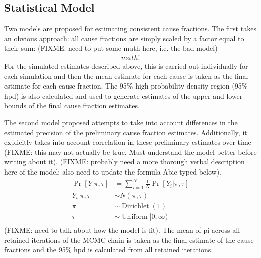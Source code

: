 \documentclass[10pt]{bmc_article}
\newcommand{\Dirichlet}{\operatorname{Dirichlet}}
\newcommand{\Uniform}{\operatorname{Uniform}}
\newenvironment{bmcformat}{\begin{raggedright}\baselineskip20pt\sloppy\setboolean{publ}{false}}{\end{raggedright}\baselineskip20pt\sloppy}
\begin{document}
\begin{bmcformat}
  \subsection*{Statistical Model}
    Two models are proposed for estimating consistent cause fractions. The first takes an obvious
    approach: all cause fractions are simply scaled by a factor equal to their sum: 
    (FIXME: need to put some math here, i.e. the bad model)
  \begin{align*}
    math!
  \end{align*}
    For the simulated estimates described above, this is carried out individually for 
    each simulation and then the mean estimate for each cause is taken as the final 
    estimate for each cause fraction. The 95\% high probability density region (95\% hpd) 
    is also calculated and used to generate estimates of the upper and lower bounds of 
    the final cause fraction estimates. \pb

    The second model proposed attempts to take into account differences in the estimated 
    precision of the preliminary cause fraction estimates. Additionally, it explicitly 
    takes into account correlation in these preliminary estimates over time (FIXME: this 
    may not actually be true. Must understand the model better before writing about it). 
    (FIXME: probably need a more thorough verbal description here of the model; also 
    need to update the formula Abie typed below). 
  \begin{align*}
    \Pr[Y | \pi, \tau] &= \sum_{i=1}^N \frac{1}{N} \Pr[Y_i | \pi, \tau]\\
    Y_i | \pi, \tau &\sim N(\pi, \tau)\\
    \pi &\sim \Dirichlet(1) \\
    \tau &\sim \Uniform[0, \infty) \\
  \end{align*}
    (FIXME: need to talk about how the model is fit). The mean of pi across all retained 
    iterations of the MCMC chain is taken as the final estimate of the cause fractions 
    and the 95\% hpd is calculated from all retained iterations. \pb


\end{bmcformat}
\end{document}
